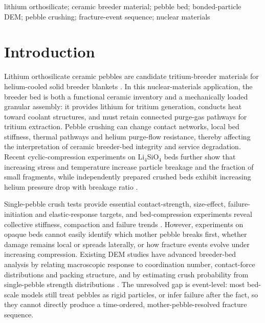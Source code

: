 \documentclass[5p,twocolumn]{elsarticle}
\begin{document}
\begin{frontmatter}
\begin{abstract}
\end{abstract}

\begin{keyword}
lithium orthosilicate; ceramic breeder material; pebble bed; bonded-particle DEM; pebble crushing; fracture-event sequence; nuclear materials
\end{keyword}
\end{frontmatter}

\section{Introduction}

Lithium orthosilicate ceramic pebbles are candidate tritium-breeder materials for helium-cooled solid breeder blankets \cite{Piazza2002CeramicBreederMaterials,Reimann2000ThermomechanicalPebbleBeds}. In this nuclear-materials application, the breeder bed is both a functional ceramic inventory and a mechanically loaded granular assembly: it provides lithium for tritium generation, conducts heat toward coolant structures, and must retain connected purge-gas pathways for tritium extraction. Pebble crushing can change contact networks, local bed stiffness, thermal pathways and helium purge-flow resistance, thereby affecting the interpretation of ceramic breeder-bed integrity and service degradation. Recent cyclic-compression experiments on Li$_4$SiO$_4$ beds further show that increasing stress and temperature increase particle breakage and the fraction of small fragments, while independently prepared crushed beds exhibit increasing helium pressure drop with breakage ratio \cite{CrushedPebblePressureDrop2024,Fang2026Li4SiO4BedCrushing}.


Single-pebble crush tests provide essential contact-strength, size-effect, failure-initiation and elastic-response targets, and bed-compression experiments reveal collective stiffness, compaction and failure trends \cite{PlateMaterialLi4SiO4,Zhao2013FailureInitiationLi4SiO4,Annabattula2014SizeDependentCrush,Bhartia2020ElasticResponse,PreliminaryLi4SiO4StructuralPerformance,ZaccariLoFrano2009CeramicPebbleBeds}. However, experiments on opaque beds cannot easily identify which mother pebble breaks first, whether damage remains local or spreads laterally, or how fracture events evolve under increasing compression. Existing DEM studies have advanced breeder-bed analysis by relating macroscopic response to coordination number, contact-force distributions and packing structure, and by estimating crush probability from single-pebble strength distributions \cite{An2007DEMCeramicBreederBeds,GanKamlah2010DEMPebbleBeds,CrushProbabilityPebbleBed2011,Wang2021CrushableCeramicPebbleBed}. The unresolved gap is event-level: most bed-scale models still treat pebbles as rigid particles, or infer failure after the fact, so they cannot directly produce a time-ordered, mother-pebble-resolved fracture sequence.
\end{document}
